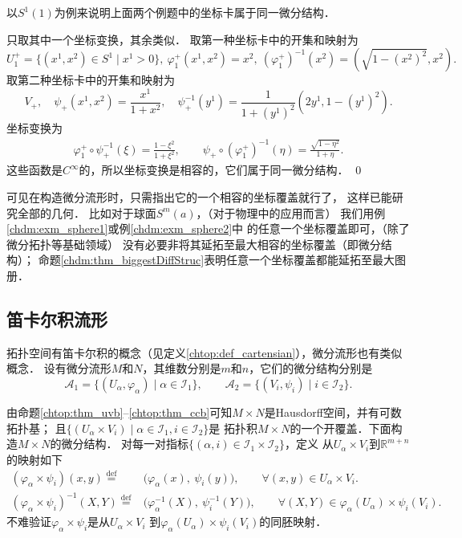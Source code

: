 \begin{example}\label{chdm:exm_sphere12}
    以$S^1(1)$为例来说明上面两个例题中的坐标卡属于同一微分结构．
\end{example}
只取其中一个坐标变换，其余类似．
取第一种坐标卡中的开集和映射为
\begin{equation*}
    U_1 ^{+} = \{(x^1,x^2)\in S^1 \mid x^1 > 0 \}, \ 
    \varphi_1 ^{+}(x^1,x^2) = x^2, \ 
    (\varphi_1 ^{+})^{-1}(x^2)=\left(\sqrt{1-(x^2)^2},x^2\right) .
\end{equation*}
取第二种坐标卡中的开集和映射为
\begin{equation*}
    V_+, \quad \psi_{+}(x^1,x^2) = \frac{x^1}{1+x^{2}}, \quad
    \psi_{+}^{-1}(y^1) = \frac{1}{1+(y^1)^2}\left(2  y^1, 1-(y^1)^2\right) .
\end{equation*}
坐标变换为
\begin{align}
    \varphi_1 ^{+} \circ \psi_{+}^{-1}(\xi) = \frac{1-\xi^2}{1+\xi^2}, \qquad
    \psi_{+}\circ (\varphi_1 ^{+})^{-1}(\eta) =\frac{\sqrt{1-\eta^2}}{1+\eta} .
\end{align}
这些函数是$C^\infty$的，所以坐标变换是相容的，它们属于同一微分结构．
\qed

{ %
    可见在构造微分流形时，只需指出它的一个相容的坐标覆盖就行了，
    这样已能研究全部的几何．  比如对于球面$S^m(a)$，（对于物理中的应用而言）
    我们用例\ref{chdm:exm_sphere1}或例\ref{chdm:exm_sphere2}中
    的任意一个坐标覆盖即可，（除了微分拓扑等基础领域）
    没有必要非将其延拓至最大相容的坐标覆盖（即微分结构）；
    命题\ref{chdm:thm_biggestDiffStruc}表明任意一个坐标覆盖都能延拓至最大图册．}

\subsection{笛卡尔积流形}\label{chdm:sec_cartensian-product}
拓扑空间有笛卡尔积的概念（见定义\ref{chtop:def_cartensian}），微分流形也有类似概念．
设有微分流形$M$和$N$，其维数分别是$m$和$n$，它们的微分结构分别是
\begin{equation}
    \mathscr{A}_1=\{(U_\alpha, \varphi_\alpha)\mid \alpha\in \mathscr{I}_1 \}, \qquad
    \mathscr{A}_2=\{(V_i, \psi_i)\mid i\in \mathscr{I}_2 \} .
\end{equation}

由命题\ref{chtop:thm_uvb}--\ref{chtop:thm_ccb}可知$M\times N$是Hausdorff空间，并有可数拓扑基；
且$\{(U_\alpha\times V_i)\mid \alpha\in \mathscr{I}_1,i\in \mathscr{I}_2\} $是
拓扑积$M\times N$的一个开覆盖．下面构造$M\times N$的微分结构．
对每一对指标$\{(\alpha,i)\in \mathscr{I}_1 \times \mathscr{I}_2\}$，定义
从$U_\alpha\times V_i$到$\mathbb{R}^{m+n}$的映射如下
\begin{align*}
    (\varphi_\alpha \times \psi_i)(x,y)\overset{\mathrm {def}}{=}&\bigl(\varphi_\alpha(x),\ \psi_i(y)\bigr),
    \qquad \forall (x,y)\in U_\alpha\times V_i . \\
    (\varphi_\alpha \times \psi_i)^{-1}(X,Y)\overset{\mathrm {def}}{=}&\bigl(\varphi_\alpha^{-1}(X),\ 
    \psi_i^{-1}(Y)\bigr),  \qquad \forall (X,Y)\in \varphi_\alpha(U_\alpha)\times \psi_i(V_i) .
\end{align*}
不难验证$\varphi_\alpha \times \psi_i$是从$U_\alpha\times V_i$
到$\varphi_\alpha(U_\alpha)\times \psi_i(V_i)$的同胚映射．

